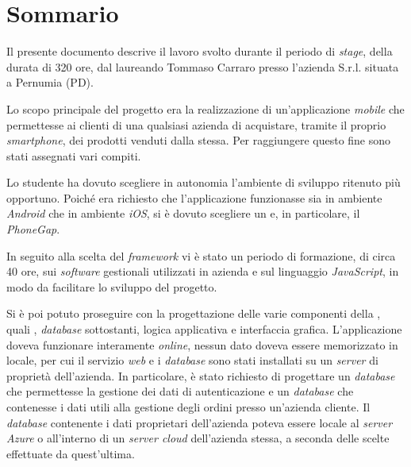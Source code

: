
\cleardoublepage
{}
{}
\begingroup
\let\clearpage\relax
\let\cleardoublepage\relax
\let\cleardoublepage\relax

\chapter*{Sommario}

Il presente documento descrive il lavoro svolto durante il periodo di \textit{stage}, della durata di 320 ore, dal laureando Tommaso Carraro presso l'azienda \visione{} S.r.l. situata a Pernumia (PD).

Lo scopo principale del progetto era la realizzazione di un'applicazione \textit{mobile} che permettesse ai clienti di una qualsiasi azienda di acquistare, tramite il proprio \textit{smartphone}, dei prodotti venduti dalla stessa. Per raggiungere questo fine sono stati assegnati vari compiti.

Lo studente ha dovuto scegliere in autonomia l'ambiente di sviluppo ritenuto più opportuno. Poiché era richiesto che l'applicazione funzionasse sia in ambiente \textit{Android} che in ambiente \textit{iOS}, si è dovuto scegliere un  e, in particolare, il  \textit{PhoneGap}.

In seguito alla scelta del \textit{framework} vi è stato un periodo di formazione, di circa 40 ore, sui \textit{software} gestionali utilizzati in azienda e sul linguaggio \textit{JavaScript}, in modo da facilitare lo sviluppo del progetto.

Si è poi potuto proseguire con la progettazione delle varie componenti della , quali , \textit{database} sottostanti, logica applicativa e interfaccia grafica. 
L'applicazione doveva funzionare interamente \textit{online}, nessun dato doveva essere memorizzato in locale, per cui il servizio \textit{web} e i \textit{database} sono stati installati su un \textit{server}  di proprietà dell'azienda.
In particolare, è stato richiesto di progettare un \textit{database} che permettesse la gestione dei dati di autenticazione e un \textit{database} che contenesse i dati utili alla gestione degli ordini presso un'azienda cliente. Il \textit{database} contenente i dati proprietari dell'azienda poteva essere locale al \textit{server Azure} o all'interno di un \textit{server cloud} dell'azienda stessa, a seconda delle scelte effettuate da quest'ultima.

